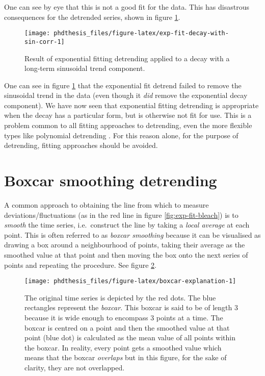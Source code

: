 \documentclass[12pt,]{book}
\theoremstyle{definition}
\theoremstyle{definition}
\theoremstyle{definition}
\theoremstyle{remark}
\begin{document}
One can see by eye that this is not a good fit for the data. This has
disastrous consequences for the detrended series, shown in figure
\ref{fig:exp-fit-decay-with-sin-corr}.





\begin{figure}

\texttt{[image: phdthesis\_files/figure-latex/exp-fit-decay-with-sin-corr-1]} \hfill{}

\caption{Result of exponential fitting
detrending applied to a decay with a long-term sinusoidal trend
component.}\label{fig:exp-fit-decay-with-sin-corr}
\end{figure}

One can see in figure \ref{fig:exp-fit-decay-with-sin-corr} that the
exponential fit detrend failed to remove the sinusoidal trend in the
data (even though it \emph{did} remove the exponential decay component).
We have now seen that exponential fitting detrending is appropriate when
the decay has a particular form, but is otherwise not fit for use. This
is a problem common to all fitting approaches to detrending, even the
more flexible types like polynomial detrending \citep{polynomial}. For
this reason alone, for the purpose of detrending, fitting approaches
should be avoided.

\section{Boxcar smoothing detrending}\label{boxcar-smoothing-detrending}

A common approach to obtaining the line from which to measure
deviations/fluctuations (as in the red line in figure
\ref{fig:exp-fit-bleach}) is to \emph{smooth} the time series,
i.e.~construct the line by taking a \emph{local average} at each point.
This is often referred to as \emph{boxcar smoothing} because it can be
visualised as drawing a box around a neighbourhood of points, taking
their average as the smoothed value at that point and then moving the
box onto the next series of points and repeating the procedure. See
figure \ref{fig:boxcar-explanation}.










\begin{figure}

\texttt{[image: phdthesis\_files/figure-latex/boxcar-explanation-1]} \hfill{}

\caption{The original time series is depicted by
the red dots. The blue rectangles represent the \emph{boxcar}. This
boxcar is said to be of length 3 because it is wide enough to encompass
3 points at a time. The boxcar is centred on a point and then the
smoothed value at that point (blue dot) is calculated as the mean value
of all points within the boxcar. In reality, every point gets a smoothed
value which means that the boxcar \emph{overlaps} but in this figure,
for the sake of clarity, they are not overlapped.}\label{fig:boxcar-explanation}
\end{figure}
\end{document}
